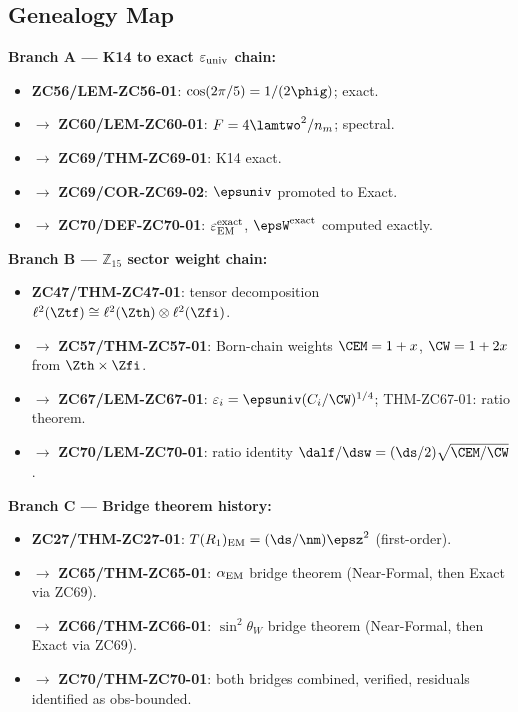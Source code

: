 \documentclass[12pt, a4paper]{article}
\renewcommand{\epsEM}{\varepsilon_{\rm EM}}
\renewcommand{\swsq}{\sin^2\!\theta_W}
\renewcommand{\aEM}{\alpha_{\rm EM}}
\begin{document}

\subsection{Genealogy Map}
\label{sec:genealogy}

\begin{genealogybox}[title={How ZC70's Key Objects Trace Back}]

\textbf{Branch A --- K14 to exact $\varepsilon_{\rm univ}$ chain:}
\begin{itemize}[leftmargin=2em, noitemsep]
  \item \textbf{ZC56/LEM-ZC56-01}: $\cos(2\pi/5)=1/(2\phig)$; exact.
  \item $\to$ \textbf{ZC60/LEM-ZC60-01}: $F=4\lamtwo^2/n_m$; spectral.
  \item $\to$ \textbf{ZC69/THM-ZC69-01}: K14 exact.
  \item $\to$ \textbf{ZC69/COR-ZC69-02}: $\epsuniv$ promoted to Exact.
  \item $\to$ \textbf{ZC70/DEF-ZC70-01}: $\epsEM^{\rm exact}$,
    $\epsW^{\rm exact}$ computed exactly.
\end{itemize}

\textbf{Branch B --- $\mathbb{Z}_{15}$ sector weight chain:}
\begin{itemize}[leftmargin=2em, noitemsep]
  \item \textbf{ZC47/THM-ZC47-01}: tensor decomposition
    $\ell^2(\Ztf) \cong \ell^2(\Zth)\otimes\ell^2(\Zfi)$.
  \item $\to$ \textbf{ZC57/THM-ZC57-01}: Born-chain weights
    $\CEM=1+x$, $\CW=1+2x$ from $\Zth\times\Zfi$.
  \item $\to$ \textbf{ZC67/LEM-ZC67-01}: $\varepsilon_i =
    \epsuniv(C_i/\CW)^{1/4}$; THM-ZC67-01: ratio theorem.
  \item $\to$ \textbf{ZC70/LEM-ZC70-01}: ratio identity
    $\dalf/\dsw = (\ds/2)\sqrt{\CEM/\CW}$.
\end{itemize}

\textbf{Branch C --- Bridge theorem history:}
\begin{itemize}[leftmargin=2em, noitemsep]
  \item \textbf{ZC27/THM-ZC27-01}: $T(R_1)_{\rm EM}=(\ds/\nm)\epsz^2$
    (first-order).
  \item $\to$ \textbf{ZC65/THM-ZC65-01}: $\aEM$ bridge theorem
    (Near-Formal, then Exact via ZC69).
  \item $\to$ \textbf{ZC66/THM-ZC66-01}: $\swsq$ bridge theorem
    (Near-Formal, then Exact via ZC69).
  \item $\to$ \textbf{ZC70/THM-ZC70-01}: both bridges
    combined, verified, residuals identified as obs-bounded.
\end{itemize}


\end{genealogybox}
\end{document}
